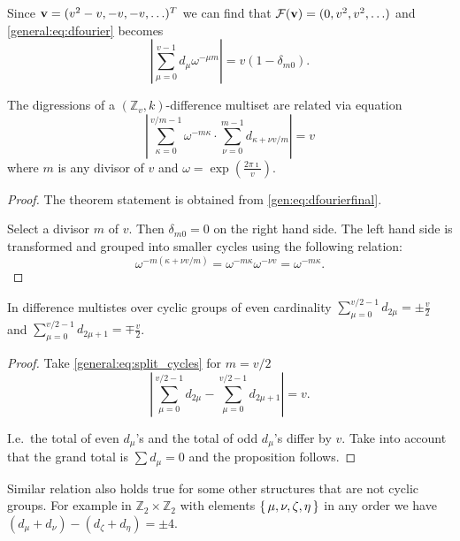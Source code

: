 Since ${\bf v} = (v^2-v, -v, -v, \ldots)^T$ we can find that $\mathcal{F}({\bf v}) = (0,v^2,v^2,\ldots)$ and \eqref{general:eq:dfourier} becomes
\begin{equation}
	\label{gen:eq:dfourierfinal}
	\left| \sum_{\mu=0}^{v-1} d_\mu \omega^{-\mu m} \right| = v (1-\delta_{m0}).
\end{equation}

\begin{theorem}
	\label{general:theorem:split_cycles}
	The digressions of a $(\mathbb Z_v, k)$-difference multiset are related via equation
	\begin{equation}
		\label{general:eq:split_cycles}
		\left| 
			\sum_{\kappa=0}^{v/m-1} \omega^{-m\kappa} \cdot 
			\sum_{\nu=0}^{m-1}  d_{\kappa+\nu v/m} 
		\right| = v
	\end{equation}
	where $m$ is any divisor of $v$ and $\omega = \exp(\frac{2\pi \imath}v)$.
\end{theorem}

\begin{proof}
	The theorem statement is obtained from \eqref{gen:eq:dfourierfinal}.
	
	Select a divisor $m$ of $v$. Then $\delta_{m0}=0$ on the right hand side. The left hand side is transformed and grouped into smaller cycles using the following relation:
	\begin{equation}
		\omega^{-m (\kappa+\nu v/m)}
		= \omega^{-m \kappa} \omega^{-\nu v}
		= \omega^{-m \kappa}.
	\end{equation}
\end{proof}

\begin{proposition}
	\label{general:theorem:even_cyclic}
	In difference multistes over cyclic groups of even cardinality $\sum_{\mu=0}^{v/2-1} d_{2\mu} = \pm \frac v2$ and $\sum_{\mu=0}^{v/2-1} d_{2\mu+1} = \mp \frac v2$.
\end{proposition}
\begin{proof}
	Take \eqref{general:eq:split_cycles} for $m=v/2$
	\begin{equation}
		\left| 
			\sum_{\mu=0}^{v/2-1} d_{2\mu} 
			- \sum_{\mu=0}^{v/2-1} d_{2\mu+1} 
		\right| = v.
	\end{equation}
	
	I.e.\ the total of even $d_\mu$'s and the total of odd $d_\mu$'s differ by $v$. Take into account that the grand total is $\sum d_\mu = 0$ and the proposition follows.
\end{proof}

\begin{remark}
	Similar relation also holds true for some other structures that are 
	not cyclic groups. For example in $\mathbb Z_2 \times \mathbb Z_2$
	with elements $\set{\mu, \nu, \zeta, \eta}$ in any order we have 
	$(d_\mu+d_\nu)-(d_\zeta+d_\eta)=\pm 4$.
\end{remark}
